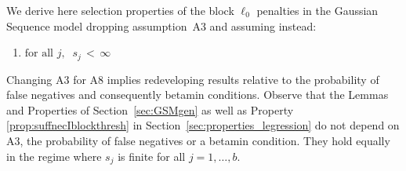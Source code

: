 \documentclass[aos]{imsart}
\theoremstyle{plain}
\begin{document}
\begin{supplement}
\label{sec:appendixGSMsfinite}


We derive here selection properties of the block $\ell_0$ penalties in the Gaussian Sequence model dropping assumption~A3 and assuming instead:
\begin{enumerate}[start=8,label={(A\arabic*)}]
    \item $\text{for all } j, \;\; s_j \,< \, \infty$
\end{enumerate}

Changing A3 for A8 implies redeveloping results relative to the probability of false negatives and consequently betamin conditions. Observe that the Lemmas and Properties of Section~\ref{sec:GSMgen} as well as Property \ref{prop:suffnecIblockthresh} in Section~\ref{sec:properties_legression} do not depend on A3, the probability of false negatives or a betamin condition. They hold equally in the regime where $s_j$ is finite for all $j=1,\ldots,b$.


\end{supplement}
\end{document}
